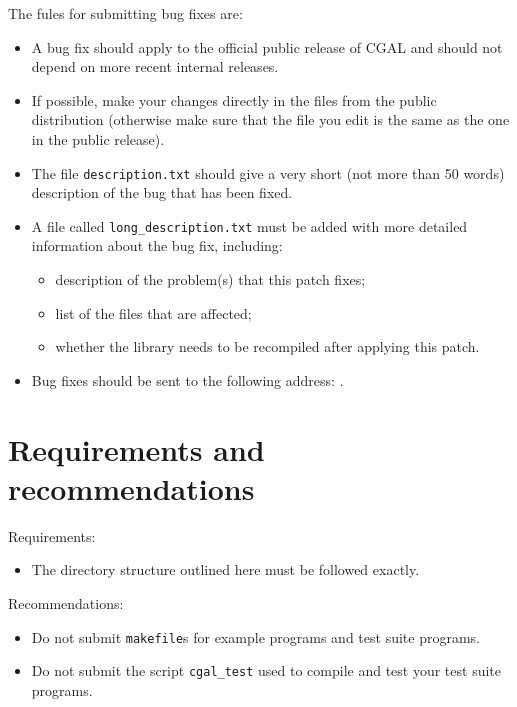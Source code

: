 The fules for submitting bug fixes are:
\begin{itemize}
   \item A bug fix should apply to the official public release of CGAL and 
         should not depend on more recent internal releases. 

   \item If possible, make your changes directly in the files from the public 
         distribution (otherwise make sure that the file you edit is the same
         as the one in the public release).

   \item The file {\tt description.txt}%
         should give a very short (not more
         than 50 words) description of the bug that has been fixed. 

   \item A file called {\tt long\_description.txt}
         must be added 
         with more detailed information about the bug fix, including: 
	 \begin{itemize}
            \item description of the problem(s) that this patch fixes;
            \item list of the files that are affected;
            \item whether the library needs to be recompiled after applying
	          this patch.
        \end{itemize}
   \item Bug fixes should be sent to the following address: 
         .
\end{itemize}

\section{Requirements and recommendations}
\label{sec:directories_req_and_rec}

\noindent
Requirements:
\begin{itemize}
   \item The directory structure outlined here must be followed exactly.
\end{itemize}

\noindent
Recommendations:
\begin{itemize}
   \item Do not submit {\tt makefile}s for example programs and test suite
         programs.
   \item Do not submit the script {\tt cgal\_test} used to compile and test
         your test suite programs.
\end{itemize}
